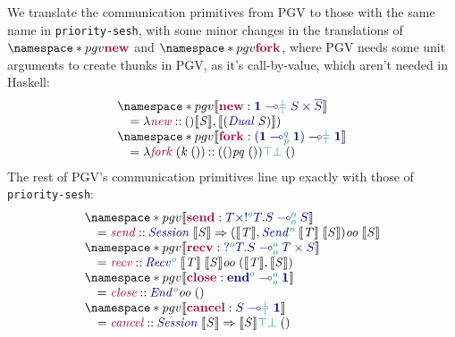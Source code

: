 \documentclass[sigplan,screen]{acmart}
\newcommand{\Conid}[1]{\mathit{#1}}
\newcommand{\Varid}[1]{\mathit{#1}}
\newcommand*\hsUnrestrictedArrow[3]{#1}
\newcommand*\hsLinearArrow[3]{#2\global\let\hsArrow=\hsUnrestrictedArrow}
\newcommand*\hsLambdaPeriod[3]{#3\global\let\hsArrow=\hsUnrestrictedArrow}
\newcommand\hsPercent{%
  \global\let\hsOne=\hsOneAfterPercentCmd}
\newcommand*\hsOneAfterPercentCmd{%
  \global\let\hsOne=1
  \global\let\hsArrow=\hsLinearArrow}
\newcommand\hsLambdaCmd{\global\let\hsArrow=\hsLambdaPeriod}
\begin{document}
We translate the communication primitives from PGV to those with the same name in \texttt{priority-sesh}, with some minor changes in the translations of $\pgv{\tm{\new}}$ and $\pgv{\tm{\fork}}$, where PGV needs some unit arguments to create thunks in PGV, as it's call-by-value, which aren't needed in Haskell:
\[
  \begin{array}{l}
    \pgv{\tosesh{\tmty{\new}{\tylolli{\top}{\bot}{\tyunit}{\typrod{S}{\co{S}}}}}}
    \\
    \quad=\ensuremath{\lambda \hsLambdaCmd ()\hsArrow{\rightarrow }{\multimap }{\mathpunct{.}}\tm{\Varid{new}}\mathbin{::}()\hsPercent \hsOne \hsArrow{\rightarrow }{\multimap }{\mathpunct{.}}(\tosesh{\Conid{S}},\tosesh{(\ty{\Conid{Dual}}\;\Conid{S})})}
    \\
    \pgv{\tosesh{\tmty{\fork}{\tylolli{\top}{\bot}{(\tylolli{p}{q}{\tyunit}{\tyunit})}{\tyunit}}}}
    \\
    \quad=\ensuremath{\lambda \hsLambdaCmd \Varid{k}\hsArrow{\rightarrow }{\multimap }{\mathpunct{.}}\tm{\Varid{fork}}\;(\Varid{k}\;())\mathbin{::}(()\hsPercent \hsOne \hsArrow{\rightarrow }{\multimap }{\mathpunct{.}}\seshtymon{\Varid{p}}{\Varid{q}}\;())\hsPercent \hsOne \hsArrow{\rightarrow }{\multimap }{\mathpunct{.}}\seshtymon{\cs{\top}}{\cs{\bot}}\;()}
  \end{array}
\]
The rest of PGV's communication primitives line up exactly with those of \texttt{priority-sesh}:
\[
  \begin{array}{l}
    \pgv{\tosesh{\tmty{\send}{\tylolli{o}{o}{\typrod{T}{\tysend[{o}]{T}{S}}}{S}}}}
    \\
    \quad=\ensuremath{\tm{\Varid{send}}\mathbin{::}\ty{\Conid{Session}}\;\tosesh{\Conid{S}}\Rightarrow (\tosesh{\Conid{T}},\seshtysend[\cs{\Varid{o}}]\;\tosesh{\Conid{T}}\;\tosesh{\Conid{S}})\hsPercent \hsOne \hsArrow{\rightarrow }{\multimap }{\mathpunct{.}}\seshtymon{\Varid{o}}{\Varid{o}}\;\tosesh{\Conid{S}}}
    \\
    \pgv{\tosesh{\tmty{\recv}{\tylolli{o}{o}{\tyrecv[{o}]{T}{S}}{\typrod{T}{S}}}}}
    \\
    \quad=\ensuremath{\tm{\Varid{recv}}\mathbin{::}\seshtyrecv[\cs{\Varid{o}}]\;\tosesh{\Conid{T}}\;\tosesh{\Conid{S}}\hsPercent \hsOne \hsArrow{\rightarrow }{\multimap }{\mathpunct{.}}\seshtymon{\Varid{o}}{\Varid{o}}\;(\tosesh{\Conid{T}},\tosesh{\Conid{S}})}
    \\
    \pgv{\tosesh{\tmty{\close}{\tylolli{o}{o}{\tyend[{o}]}{\tyunit}}}}
    \\
    \quad=\ensuremath{\tm{\Varid{close}}\mathbin{::}\seshtyend[\cs{\Varid{o}}]\hsPercent \hsOne \hsArrow{\rightarrow }{\multimap }{\mathpunct{.}}\seshtymon{\Varid{o}}{\Varid{o}}\;()}
    \\
    \pgv{\tosesh{\tmty{\cancel}{\tylolli{\top}{\bot}{S}{\tyunit}}}}
    \\
    \quad=\ensuremath{\tm{\Varid{cancel}}\mathbin{::}\ty{\Conid{Session}}\;\tosesh{\Conid{S}}\Rightarrow \tosesh{\Conid{S}}\hsPercent \hsOne \hsArrow{\rightarrow }{\multimap }{\mathpunct{.}}\seshtymon{\cs{\top}}{\cs{\bot}}\;()}
  \end{array}
\]
\end{document}
